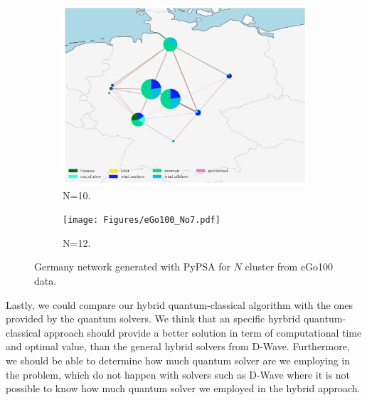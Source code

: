 \begin{figure}[H]
\begin{subfigure}[c]{0.5\linewidth}
\includegraphics[width=\linewidth]{Figures/eGo100_No6.pdf}
\caption{N=10.}
\label{fig:3c}
\end{subfigure}\hfill    
\begin{subfigure}[c]{0.5\linewidth}
\texttt{[image: Figures/eGo100\_No7.pdf]}
\caption{N=12.}
\label{fig:3d}
\end{subfigure}
    
\caption{Germany network generated with PyPSA for $N$ cluster from eGo100 data.}
\label{fig:GeneralNetworks}
\end{figure}
Lastly, we could compare our hybrid quantum-classical algorithm with the ones provided by the quantum solvers. We think that an specific hyrbrid quantum-classical approach should provide a better solution in term of computational time and optimal value, than the general hybrid solvers from D-Wave. Furthermore, we should be able to determine how much quantum solver are we employing in the problem, which do not happen with solvers such as D-Wave where it is not possible to know how much quantum solver we employed in the hybrid approach.